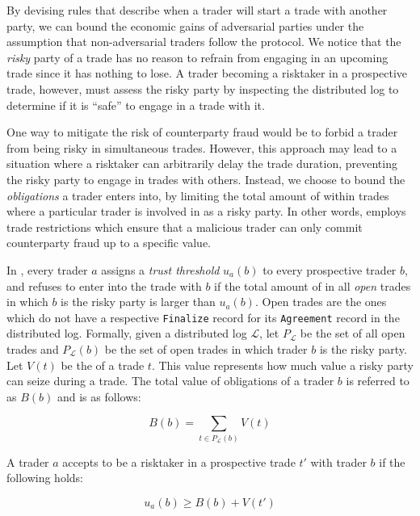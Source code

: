 By devising rules that describe when a trader will start a trade with another party, we can bound the economic gains of adversarial parties under the assumption that non-adversarial traders follow the protocol.
We notice that the \emph{risky} party of a trade has no reason to refrain from engaging in an upcoming trade since it has nothing to lose.
A trader becoming a risktaker in a prospective trade, however, must assess the risky party by inspecting the distributed log to determine if it is \enquote{safe} to engage in a trade with it.

One way to mitigate the risk of counterparty fraud would be to forbid a trader from being risky in simultaneous trades.
However, this approach may lead to a situation where a risktaker can arbitrarily delay the trade duration, preventing the risky party to engage in trades with others.
Instead, we choose to bound the \emph{obligations} a trader enters into, by limiting the total amount of \MarginalStake{} within trades where a particular trader is involved in as a risky party.
In other words, \ModelName{} employs trade restrictions which ensure that a malicious trader can only commit counterparty fraud up to a specific value.

In \ModelName{}, every trader $ a $ assigns a \emph{trust threshold} $ u_a(b) $ to every prospective trader $ b $, and refuses to enter into the trade with $ b $ if the total amount of \MarginalStake{} in all \emph{open} trades in which $ b $ is the risky party is larger than $ u_a(b) $. 
Open trades are the ones which do not have a respective \texttt{Finalize} record for its \texttt{Agreement} record in the distributed log.
Formally, given a distributed log $ \mathcal{L} $, let $ P_{\mathcal{L}} $ be the set of all open trades and $ P_{\mathcal{L}}(b) $ be the set of open trades in which trader $ b $ is the risky party. Let $ V(t) $ be the \MarginalStake{} of a trade $ t $.
This value represents how much value a risky party can seize during a trade.
The total value of obligations of a trader $ b $ is referred to as $ B(b) $ and is as follows:

\begin{equation}
	B(b) = \sum_{t \in P_{\mathcal{L}}(b)} V(t)
\end{equation}

A trader $ a $ accepts to be a risktaker in a prospective trade $ t' $ with trader $ b $ if the following holds:

\begin{equation}
	u_a(b) \geq B(b) + V(t')
\end{equation}

